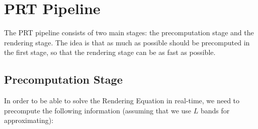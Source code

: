 \section{PRT Pipeline}

The PRT pipeline consists of two main stages: the precomputation stage and the rendering stage. The idea is that as much as possible should be precomputed in the first stage, so that the rendering stage can be as fast as possible.

\subsection{Precomputation Stage}

In order to be able to solve the Rendering Equation in real-time, we need to precompute the following information (assuming that we use $L$ bands for approximating):

